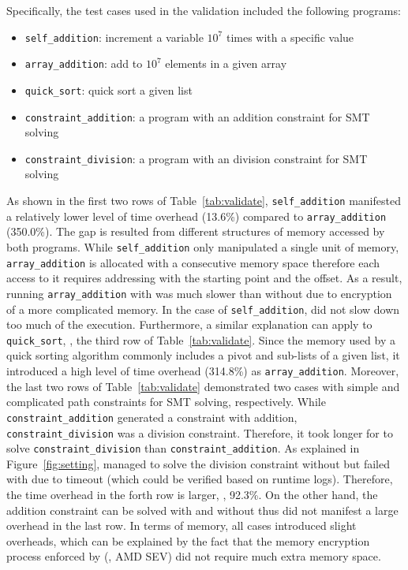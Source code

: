 Specifically, the test cases used in the validation included the following programs:
\begin{itemize}[leftmargin=*]
\item \texttt{self\_addition}: increment a variable $10^7$ times with a specific value

\item \texttt{array\_addition}: add to $10^7$ elements in a given array

\item \texttt{quick\_sort}: quick sort a given list

\item \texttt{constraint\_addition}: a program with an addition constraint for SMT solving

\item \texttt{constraint\_division}: a program with an division constraint for SMT solving
\end{itemize}

As shown in the first two rows of Table~\ref{tab:validate}, \texttt{self\_addition} manifested 
a relatively lower level of time overhead (13.6\%) compared to \texttt{array\_addition} (350.0\%). The gap 
is resulted from different structures of memory accessed by both programs. While 
\texttt{self\_addition} only manipulated a single unit of memory, \texttt{array\_addition} 
is allocated with a consecutive memory space therefore each access to it requires addressing 
with the starting point and the offset. As a result, running \texttt{array\_addition} with \tee 
was much slower than without \tee due to encryption of a more complicated memory. In the case 
of \texttt{self\_addition}, \tee did not slow down too much of the execution. Furthermore, a similar 
explanation can apply to \texttt{quick\_sort}, \ie, the third row of Table~\ref{tab:validate}. Since 
the memory used by a quick sorting algorithm commonly includes a pivot and sub-lists of a given list, 
it introduced a high level of time overhead (314.8\%) as \texttt{array\_addition}. Moreover, the last 
two rows of Table~\ref{tab:validate} demonstrated two cases with simple and complicated path 
constraints for SMT solving, respectively. While \texttt{constraint\_addition} generated a 
constraint with addition, \texttt{constraint\_division} was a division constraint. Therefore, it took 
longer for \tool to solve \texttt{constraint\_division} than \texttt{constraint\_addition}. As 
explained in Figure~\ref{fig:setting}, \tool managed to solve the division constraint without \tee 
but failed with \tee due to timeout (which could be verified based on runtime logs). 
Therefore, the time overhead in the forth row is larger, \ie, 92.3\%. On the 
other hand, the addition constraint can be solved with and without \tee thus did not manifest a large 
overhead in the last row. In terms of memory, all cases introduced slight overheads, which can be 
explained by the fact that the memory encryption process enforced by \tee (\ie, AMD SEV) 
did not require much extra memory space.